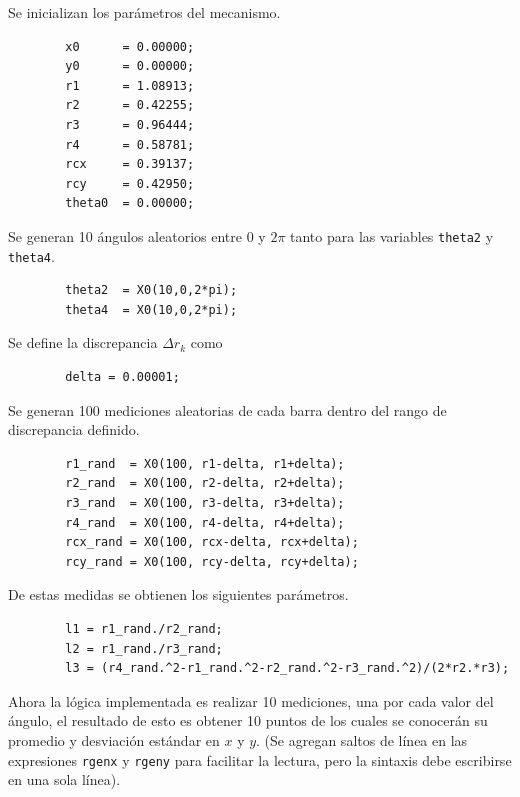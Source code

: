 \documentclass[a4paper, 12pt]{article}
\begin{document}
    Se inicializan los parámetros del mecanismo.

    \begin{verbatim}
        x0      = 0.00000;
        y0      = 0.00000;
        r1      = 1.08913;
        r2      = 0.42255;
        r3      = 0.96444;
        r4      = 0.58781;
        rcx     = 0.39137;
        rcy     = 0.42950;
        theta0  = 0.00000;
    \end{verbatim}

    Se generan 10 ángulos aleatorios entre $0$ y $2\pi$ tanto para las variables \verb|theta2| y \verb|theta4|.

    \begin{verbatim}
        theta2  = X0(10,0,2*pi);
        theta4  = X0(10,0,2*pi);
    \end{verbatim}

    Se define la discrepancia $\Delta r_k$ como

    \begin{verbatim}
        delta = 0.00001;
    \end{verbatim}

    Se generan 100 mediciones aleatorias de cada barra dentro del rango de discrepancia definido.

    \begin{verbatim}
        r1_rand  = X0(100, r1-delta, r1+delta);
        r2_rand  = X0(100, r2-delta, r2+delta);
        r3_rand  = X0(100, r3-delta, r3+delta);
        r4_rand  = X0(100, r4-delta, r4+delta);
        rcx_rand = X0(100, rcx-delta, rcx+delta);
        rcy_rand = X0(100, rcy-delta, rcy+delta);
    \end{verbatim}

    De estas medidas se obtienen los siguientes parámetros.

    \begin{verbatim}
        l1 = r1_rand./r2_rand;
        l2 = r1_rand./r3_rand;
        l3 = (r4_rand.^2-r1_rand.^2-r2_rand.^2-r3_rand.^2)/(2*r2.*r3);
    \end{verbatim}

    Ahora la lógica implementada es realizar 10 mediciones, una por cada valor del ángulo, el resultado de esto es obtener 10 puntos de los cuales se conocerán su promedio y desviación estándar en $x$ y $y$. (Se agregan saltos de línea en las expresiones \verb|rgenx| y \verb|rgeny| para facilitar la lectura, pero la sintaxis debe escribirse en una sola línea).
\end{document}
